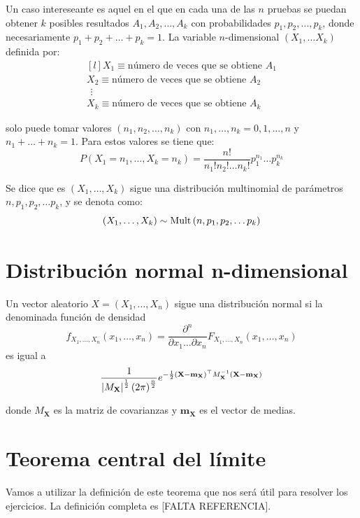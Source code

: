 \documentclass[a4paper]{book}
\renewcommand{\vec}[1]{\mathbf{#1}} %
\begin{document}
Un caso intereseante es aquel en el que en cada una de las $n$ pruebas se puedan obtener $k$ posibles resultados $A_1,A_2, \dots ,A_k$ con probabilidades $p_1,p_2, \dots ,p_k$, donde necesariamente $p_1 +p_2 + \dots + p_k = 1$. La variable $n$-dimensional $\left( X_1, \dots X_k \right)$ definida por:
\[ \begin{matrix*}[l]
	X_1 \equiv \text{número de veces que se obtiene }A_1\\[5pt] 
	X_2 \equiv \text{número de veces que se obtiene }A_2\\[5pt] 
	\ \, \vdots \\[5pt] 
	X_k \equiv \text{número de veces que se obtiene }A_k
\end{matrix*} \]

solo puede tomar valores $\left( n_1, n_2, \dots , n_k \right)$ con $n_1,\dots ,n_k=0,1,\dots ,n$ y $n_1 + \dots + n_k = 1$. Para estos valores se tiene que:
\[ P \left( X_1=n_1, \dots , X_k = n_k \right) = \frac{n!}{n_1!n_2!\dots n_k!} p_1^{n_1} \dots p_k^{n_k} \]

Se dice que es $\left( X_1,\dots ,X_k \right)$ sigue una distribución multinomial de parámetros $n,p_1,p_2,\dots p_k$, y se denota como:
\[ \left( X_1,\dots ,X_k \right) \sim \operatorname{Mult} \left( n,p_1,p_2,\dots p_k \right) \]

\section{Distribución normal n-dimensional}

Un vector aleatorio $ X = \left( X_1, \dots , X_n \right) $ sigue una distribución normal si la denominada función de densidad
\[ f_{X_1,\dots , X_n}\left( x_1, \dots , x_n \right) = \frac{\partial ^n}{\partial x_1 \dots \partial x_n}F_{X_1, \dots , X_n} \left( x_1, \dots , x_n \right)\]
es igual a
\[ \frac{1}{\abs{M_{\vec{X}}}^{\frac{1}{2} } \left( 2 \pi  \right) ^{\frac{n}{2}}} e^{-\frac{1}{2}\left( \vec{X} - \vec{m}_{\vec{X}} \right) ^{\top} M_{\vec{X}}^{-1} \left( \vec{X} - \vec{m}_{\vec{X}} \right) }\]

donde $M_{\vec{X}}$ es la matriz de covarianzas y $\vec{m}_{\vec{X}}$ es el vector de medias.

\section{Teorema central del límite}

Vamos a utilizar la definición de este teorema que nos será útil para resolver los ejercicios. La definición completa es [FALTA REFERENCIA].
\end{document}
